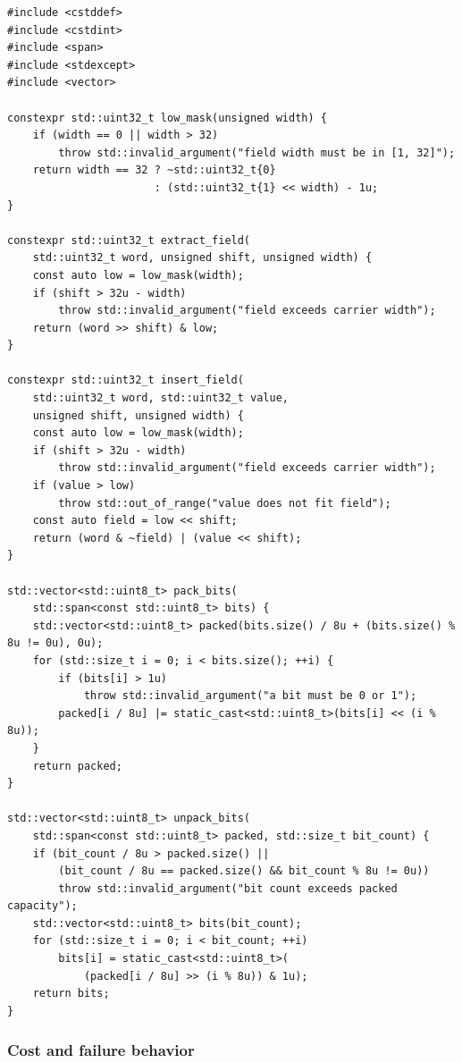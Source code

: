 \begin{verbatim}
#include <cstddef>
#include <cstdint>
#include <span>
#include <stdexcept>
#include <vector>

constexpr std::uint32_t low_mask(unsigned width) {
    if (width == 0 || width > 32)
        throw std::invalid_argument("field width must be in [1, 32]");
    return width == 32 ? ~std::uint32_t{0}
                       : (std::uint32_t{1} << width) - 1u;
}

constexpr std::uint32_t extract_field(
    std::uint32_t word, unsigned shift, unsigned width) {
    const auto low = low_mask(width);
    if (shift > 32u - width)
        throw std::invalid_argument("field exceeds carrier width");
    return (word >> shift) & low;
}

constexpr std::uint32_t insert_field(
    std::uint32_t word, std::uint32_t value,
    unsigned shift, unsigned width) {
    const auto low = low_mask(width);
    if (shift > 32u - width)
        throw std::invalid_argument("field exceeds carrier width");
    if (value > low)
        throw std::out_of_range("value does not fit field");
    const auto field = low << shift;
    return (word & ~field) | (value << shift);
}

std::vector<std::uint8_t> pack_bits(
    std::span<const std::uint8_t> bits) {
    std::vector<std::uint8_t> packed(bits.size() / 8u + (bits.size() % 8u != 0u), 0u);
    for (std::size_t i = 0; i < bits.size(); ++i) {
        if (bits[i] > 1u)
            throw std::invalid_argument("a bit must be 0 or 1");
        packed[i / 8u] |= static_cast<std::uint8_t>(bits[i] << (i % 8u));
    }
    return packed;
}

std::vector<std::uint8_t> unpack_bits(
    std::span<const std::uint8_t> packed, std::size_t bit_count) {
    if (bit_count / 8u > packed.size() ||
        (bit_count / 8u == packed.size() && bit_count % 8u != 0u))
        throw std::invalid_argument("bit count exceeds packed capacity");
    std::vector<std::uint8_t> bits(bit_count);
    for (std::size_t i = 0; i < bit_count; ++i)
        bits[i] = static_cast<std::uint8_t>(
            (packed[i / 8u] >> (i % 8u)) & 1u);
    return bits;
}
\end{verbatim}

\subsubsection{Cost and failure behavior}\label{appendix-4e2236f53445-cost-and-failure-behavior}

